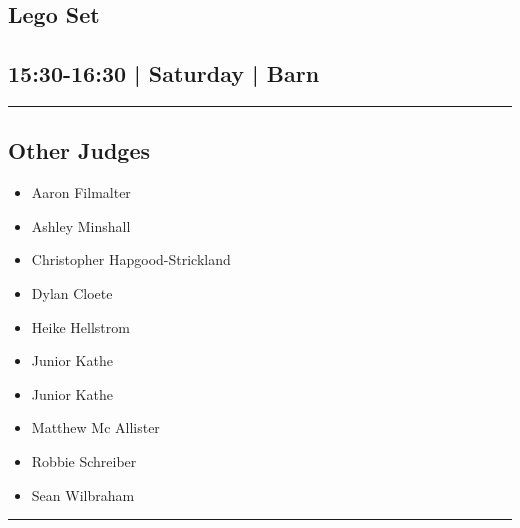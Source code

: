 \documentclass[10pt, A5]{article}
\begin{document}
        \begin{framed}
        \begin{minipage}{\textwidth}

        \setcounter{section}{23}
        \section{Lego Set}
        \subsection*{15:30-16:30 | Saturday | Barn}

        \vspace{0.25cm}
        \hrule
        \vspace{0.25cm}


        \subsection*{Other Judges}
                    

        	\begin{multicols}{2}

		\begin{itemize}
									\item Aaron Filmalter
									\item Ashley Minshall
									\item Christopher Hapgood-Strickland
									\item Dylan Cloete
									\item Heike Hellstrom
									\item Junior Kathe
						\end{itemize}

		\vfill\null
		\columnbreak

		\begin{itemize}
									\item Junior Kathe
									\item Matthew Mc Allister
									\item Robbie Schreiber
									\item Sean Wilbraham
						\end{itemize}

		\vfill\null

		\end{multicols}

    \vspace{0.25cm}
        \hrule
        \vspace{0.25cm}


\end{minipage}
\end{framed}
\end{document}
